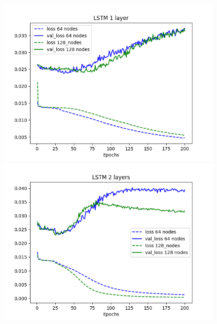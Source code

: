 \documentclass[11pt]
{article}
\begin{document}
\begin{figure}[ht]
\begin{minipage}[b]{0.33\linewidth}
		\includegraphics[width=\linewidth]{../TESTS_RESULTS/LSTM_tests/plots/1_comp.png} 
	\end{minipage}%
	\begin{minipage}[b]{0.33\linewidth}
		\centering
		\includegraphics[width=\linewidth]{../TESTS_RESULTS/LSTM_tests/plots/2_comp.png} 
	\end{minipage} 
	\begin{minipage}[b]{0.33\linewidth}
		\centering

\end{minipage}
\end{figure}
\end{document}
